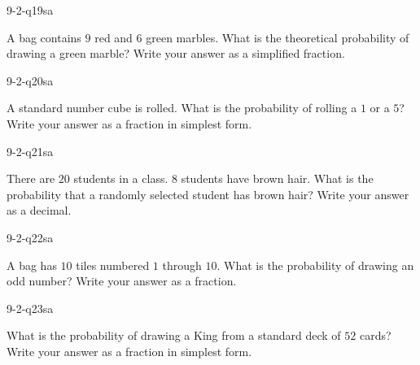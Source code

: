 
\begin{practiceQuestion}{9-2-q19}{sa}
\begin{questionText}
A bag contains $9$ red and $6$ green marbles. What is the theoretical probability of drawing a green marble? Write your answer as a simplified fraction.
\end{questionText}
\end{practiceQuestion}

\begin{practiceQuestion}{9-2-q20}{sa}
\begin{questionText}
A standard number cube is rolled. What is the probability of rolling a $1$ or a $5$? Write your answer as a fraction in simplest form.
\end{questionText}
\end{practiceQuestion}

\begin{practiceQuestion}{9-2-q21}{sa}
\begin{questionText}
There are $20$ students in a class. $8$ students have brown hair. What is the probability that a randomly selected student has brown hair? Write your answer as a decimal.
\end{questionText}
\end{practiceQuestion}

\begin{practiceQuestion}{9-2-q22}{sa}
\begin{questionText}
A bag has $10$ tiles numbered $1$ through $10$. What is the probability of drawing an odd number? Write your answer as a fraction.
\end{questionText}
\end{practiceQuestion}

\begin{practiceQuestion}{9-2-q23}{sa}
\begin{questionText}
What is the probability of drawing a King from a standard deck of $52$ cards? Write your answer as a fraction in simplest form.
\end{questionText}
\end{practiceQuestion}

